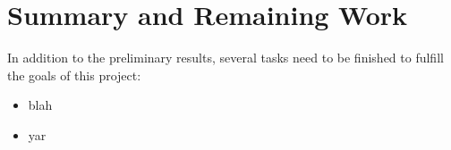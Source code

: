 \section{Summary and Remaining Work}
\label{sec:future_work}

In addition to the preliminary results, several tasks need to
be finished to fulfill the goals of this project:

\begin{itemize}
\item blah
\item yar
\end{itemize}
